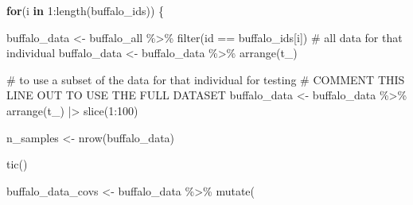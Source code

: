 \documentclass[
  letterpaper,
  DIV=11,
  numbers=noendperiod]{scrartcl}
\newenvironment{Shaded}{\begin{snugshade}}{\end{snugshade}}
\newcommand{\CommentTok}[1]{\textcolor[rgb]{0.37,0.37,0.37}{#1}}
\newcommand{\ControlFlowTok}[1]{\textcolor[rgb]{0.00,0.23,0.31}{\textbf{#1}}}
\newcommand{\DecValTok}[1]{\textcolor[rgb]{0.68,0.00,0.00}{#1}}
\newcommand{\FunctionTok}[1]{\textcolor[rgb]{0.28,0.35,0.67}{#1}}
\newcommand{\NormalTok}[1]{\textcolor[rgb]{0.00,0.23,0.31}{#1}}
\newcommand{\OtherTok}[1]{\textcolor[rgb]{0.00,0.23,0.31}{#1}}
\newcommand{\SpecialCharTok}[1]{\textcolor[rgb]{0.37,0.37,0.37}{#1}}
\begin{document}
\begin{Shaded}
\begin{Highlighting}[]
\ControlFlowTok{for}\NormalTok{(i }\ControlFlowTok{in} \DecValTok{1}\SpecialCharTok{:}\FunctionTok{length}\NormalTok{(buffalo\_ids)) \{}

\NormalTok{  buffalo\_data }\OtherTok{\textless{}{-}}\NormalTok{ buffalo\_all }\SpecialCharTok{\%\textgreater{}\%} \FunctionTok{filter}\NormalTok{(id }\SpecialCharTok{==}\NormalTok{ buffalo\_ids[i])}
  \CommentTok{\# all data for that individual}
\NormalTok{  buffalo\_data }\OtherTok{\textless{}{-}}\NormalTok{ buffalo\_data }\SpecialCharTok{\%\textgreater{}\%} \FunctionTok{arrange}\NormalTok{(t\_)}
  
  \CommentTok{\# to use a subset of the data for that individual for testing}
  \CommentTok{\# COMMENT THIS LINE OUT TO USE THE FULL DATASET}
\NormalTok{  buffalo\_data }\OtherTok{\textless{}{-}}\NormalTok{ buffalo\_data }\SpecialCharTok{\%\textgreater{}\%} \FunctionTok{arrange}\NormalTok{(t\_) }\SpecialCharTok{|\textgreater{}}  \FunctionTok{slice}\NormalTok{(}\DecValTok{1}\SpecialCharTok{:}\DecValTok{100}\NormalTok{)}

\NormalTok{  n\_samples }\OtherTok{\textless{}{-}} \FunctionTok{nrow}\NormalTok{(buffalo\_data)}
  
  \FunctionTok{tic}\NormalTok{()}
  
\NormalTok{  buffalo\_data\_covs }\OtherTok{\textless{}{-}}\NormalTok{ buffalo\_data }\SpecialCharTok{\%\textgreater{}\%} \FunctionTok{mutate}\NormalTok{(}
    

\end{Highlighting}
\end{Shaded}
\end{document}

